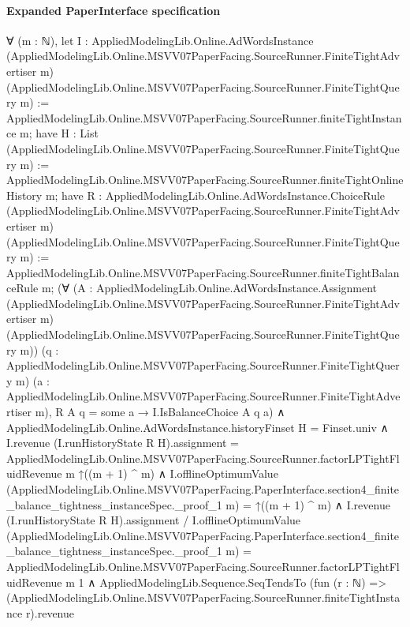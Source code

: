 \documentclass[10pt]{article}
\begin{document}
\paragraph{Expanded PaperInterface specification}
\begin{ReviewVerbatim}
∀ (m : ℕ),
  let I :
    AppliedModelingLib.Online.AdWordsInstance
      (AppliedModelingLib.Online.MSVV07PaperFacing.SourceRunner.FiniteTightAdvertiser m)
      (AppliedModelingLib.Online.MSVV07PaperFacing.SourceRunner.FiniteTightQuery m) :=
    AppliedModelingLib.Online.MSVV07PaperFacing.SourceRunner.finiteTightInstance m;
  have H : List (AppliedModelingLib.Online.MSVV07PaperFacing.SourceRunner.FiniteTightQuery m) :=
    AppliedModelingLib.Online.MSVV07PaperFacing.SourceRunner.finiteTightOnlineHistory m;
  have R :
    AppliedModelingLib.Online.AdWordsInstance.ChoiceRule
      (AppliedModelingLib.Online.MSVV07PaperFacing.SourceRunner.FiniteTightAdvertiser m)
      (AppliedModelingLib.Online.MSVV07PaperFacing.SourceRunner.FiniteTightQuery m) :=
    AppliedModelingLib.Online.MSVV07PaperFacing.SourceRunner.finiteTightBalanceRule m;
  (∀
      (A :
        AppliedModelingLib.Online.AdWordsInstance.Assignment
          (AppliedModelingLib.Online.MSVV07PaperFacing.SourceRunner.FiniteTightAdvertiser m)
          (AppliedModelingLib.Online.MSVV07PaperFacing.SourceRunner.FiniteTightQuery m))
      (q : AppliedModelingLib.Online.MSVV07PaperFacing.SourceRunner.FiniteTightQuery m)
      (a : AppliedModelingLib.Online.MSVV07PaperFacing.SourceRunner.FiniteTightAdvertiser m),
      R A q = some a → I.IsBalanceChoice A q a) ∧
    AppliedModelingLib.Online.AdWordsInstance.historyFinset H = Finset.univ ∧
      I.revenue (I.runHistoryState R H).assignment =
          AppliedModelingLib.Online.MSVV07PaperFacing.SourceRunner.factorLPTightFluidRevenue m ↑((m + 1) ^ m) ∧
        I.offlineOptimumValue
              (AppliedModelingLib.Online.MSVV07PaperFacing.PaperInterface.section4_finite_balance_tightness_instanceSpec._proof_1
                m) =
            ↑((m + 1) ^ m) ∧
          I.revenue (I.runHistoryState R H).assignment /
                I.offlineOptimumValue
                  (AppliedModelingLib.Online.MSVV07PaperFacing.PaperInterface.section4_finite_balance_tightness_instanceSpec._proof_1
                    m) =
              AppliedModelingLib.Online.MSVV07PaperFacing.SourceRunner.factorLPTightFluidRevenue m 1 ∧
            AppliedModelingLib.Sequence.SeqTendsTo
              (fun (r : ℕ) =>
                (AppliedModelingLib.Online.MSVV07PaperFacing.SourceRunner.finiteTightInstance r).revenue

\end{ReviewVerbatim}
\end{document}
